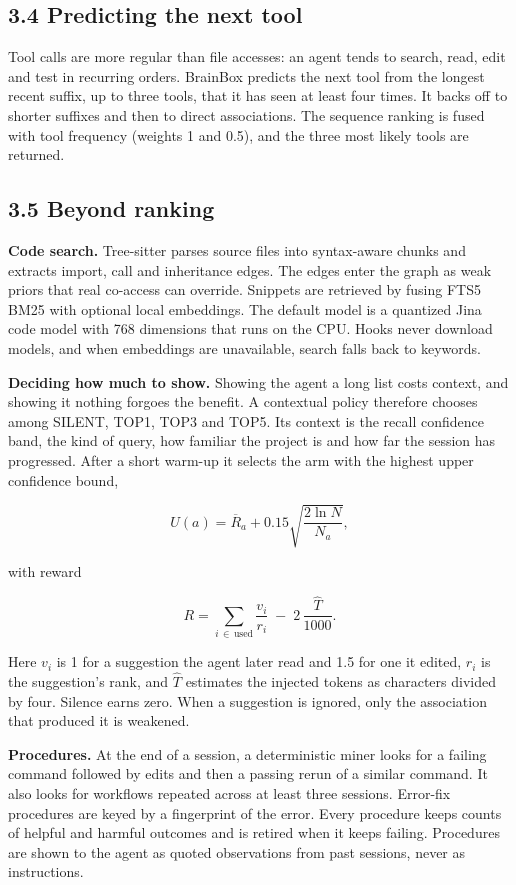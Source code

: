 \documentclass[
  american,
  11pt,
]{article}
\begin{document}
\subsection{3.4 Predicting the next tool}\label{predicting-the-next-tool}

Tool calls are more regular than file accesses: an agent tends to search, read, edit and test in recurring
orders. BrainBox predicts the next tool from the longest recent suffix, up to three tools, that it has seen at
least four times. It backs off to shorter suffixes and then to direct associations. The sequence ranking is
fused with tool frequency (weights 1 and 0.5), and the three most likely tools are returned.

\subsection{3.5 Beyond ranking}\label{beyond-ranking}

\textbf{Code search.} Tree-sitter parses source files into syntax-aware chunks and extracts import, call and
inheritance edges. The edges enter the graph as weak priors that real co-access can override. Snippets are
retrieved by fusing FTS5 BM25 with optional local embeddings. The default model is a quantized Jina code model
with 768 dimensions that runs on the CPU. Hooks never download models, and when embeddings are unavailable,
search falls back to keywords.

\textbf{Deciding how much to show.} Showing the agent a long list costs context, and showing it nothing
forgoes the benefit. A contextual policy therefore chooses among SILENT, TOP1, TOP3 and TOP5. Its context is
the recall confidence band, the kind of query, how familiar the project is and how far the session has
progressed. After a short warm-up it selects the arm with the highest upper confidence bound,

\[
U(a)=\overline{R}_a+0.15\sqrt{\frac{2\ln N}{N_a}},
\]

with reward

\[
R=\sum_{i\,\in\,\text{used}}\frac{v_i}{r_i}\;-\;2\,\frac{\widehat{T}}{1000}.
\]

Here \(v_i\) is 1 for a suggestion the agent later read and 1.5 for one it edited, \(r_i\) is the suggestion's
rank, and \(\widehat{T}\) estimates the injected tokens as characters divided by four. Silence earns zero.
When a suggestion is ignored, only the association that produced it is weakened.

\textbf{Procedures.} At the end of a session, a deterministic miner looks for a failing command followed by
edits and then a passing rerun of a similar command. It also looks for workflows repeated across at least
three sessions. Error-fix procedures are keyed by a fingerprint of the error. Every procedure keeps counts of
helpful and harmful outcomes and is retired when it keeps failing. Procedures are shown to the agent as quoted
observations from past sessions, never as instructions.
\end{document}
